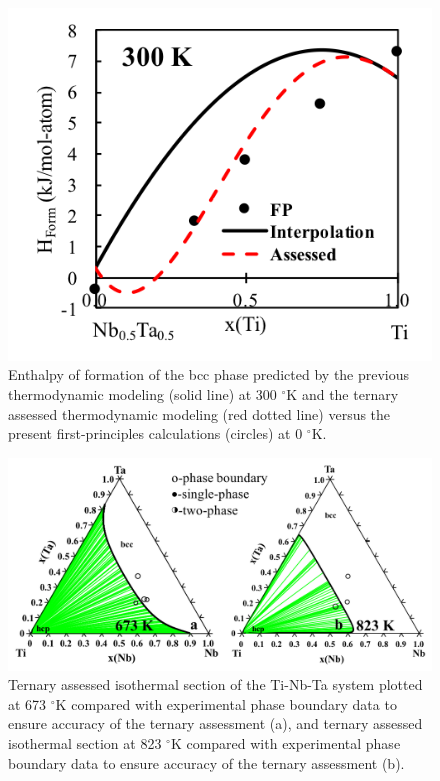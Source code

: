 \newpage
\begin{figure}[H]
	\centering
	\includegraphics{Chapter-3/Figures/TiNbTa2.png}
	\caption{Enthalpy of formation of the bcc phase predicted by the previous thermodynamic modeling (solid line) at 300 $^{\circ}$K and the ternary assessed thermodynamic modeling (red dotted line) versus the present first-principles calculations (circles) at 0 $^{\circ}$K.}
	\label{Ch3-figure:TiNbTa2}
\end{figure}

\newpage
\begin{figure}[H]
	\centering
	\includegraphics[width=\textwidth]{Chapter-3/Figures/TiNbTa3.png}
	\caption{Ternary assessed isothermal section of the Ti-Nb-Ta system plotted at 673 $^{\circ}$K compared with experimental phase boundary data \cite{Na2001} to ensure accuracy of the ternary assessment (a), and ternary assessed isothermal section at 823 $^{\circ}$K compared with experimental phase boundary data \cite{Na2001} to ensure accuracy of the ternary assessment (b).}
	\label{Ch3-figure:TiNbTa3}
\end{figure}


